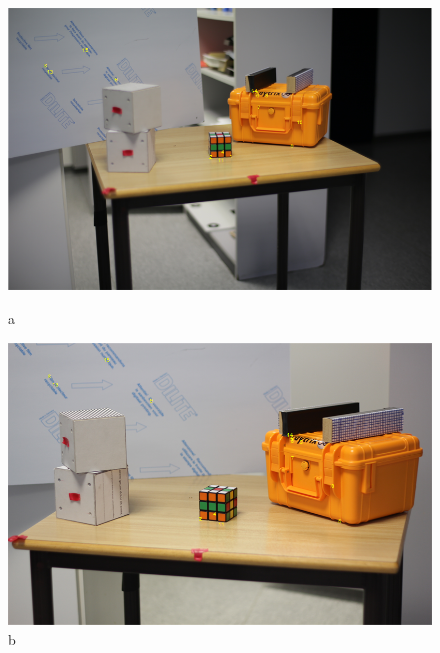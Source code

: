 \begin{figure}[!htb]
	\includegraphics[width=\linewidth]{images/PointsDetectedLeft.png}
	\caption{a}
	\label{fig:SurfRechts}
	\endminipage\hfill
	\includegraphics[width=\linewidth]{images/PointsDetectedRight.png}
	\caption{b}
	\label{fig:SurfLinks}
	\endminipage\hfill
\end{figure}
\pagebreak

